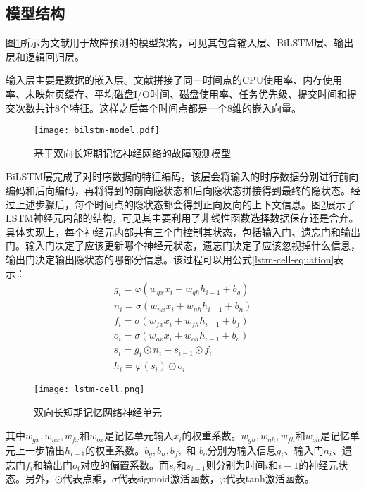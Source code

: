 \subsection{模型结构}
图\ref{bilstm-model}所示为文献\parencite{gao2020task}用于故障预测的模型架构，可见其包含输入层、BiLSTM层、输出层和逻辑回归层。

输入层主要是数据的嵌入层。文献\parencite{gao2020task}拼接了同一时间点的CPU使用率、内存使用率、未映射页缓存、平均磁盘I/O时间、磁盘使用率、任务优先级、提交时间和提交次数共计8个特征。这样之后每个时间点都是一个8维的嵌入向量。
\begin{figure}[htbp]
    \centering
    \texttt{[image: bilstm-model.pdf]}
    \caption{基于双向长短期记忆神经网络的故障预测模型\label{bilstm-model}}
\end{figure}

BiLSTM层完成了对时序数据的特征编码。该层会将输入的时序数据分别进行前向编码和后向编码，再将得到的前向隐状态和后向隐状态拼接得到最终的隐状态。经过上述步骤后，每个时间点的隐状态都会得到正向反向的上下文信息。图\ref{lstm-cell}展示了LSTM神经元内部的结构，可见其主要利用了非线性函数选择数据保存还是舍弃。具体实现上，每个神经元内部共有三个门控制其状态，包括输入门、遗忘门和输出门。输入门决定了应该更新哪个神经元状态，遗忘门决定了应该忽视掉什么信息，输出门决定输出隐状态的哪部分信息。该过程可以用公式\ref{lstm-cell-equation}表示：
\begin{equation}
    \begin{array}{l}
    g_{i}=\varphi\left(w_{g x} x_{i}+w_{g h} h_{i - 1}+b_{g}\right) \\
    n_{i}=\sigma\left(w_{n x} x_{i}+w_{n h} h_{i- 1}+b_{n}\right) \\
    f_{i}=\sigma\left(w_{f x} x_{i}+w_{f h} h_{i- 1}+b_{f}\right) \\
    o_{i}=\sigma\left(w_{o x} x_{i}+w_{o h} h_{i- 1}+b_{o}\right) \\
    s_{i}=g_{i} \odot n_{i}+s_{i -1} \odot f_{i} \\
    h_{i}=\varphi\left(s_{i}\right) \odot o_{i}
    \end{array}
    \label{lstm-cell-equation}
\end{equation}
\begin{figure}[htbp]
    \centering
    \texttt{[image: lstm-cell.png]}
    \caption{双向长短期记忆网络神经单元\cite{gao2020task}\label{lstm-cell}}
\end{figure}
其中$w_{gx}, w_{nx}, w_{fx} $和$w_{ox} $是记忆单元输入$x_{i}$的权重系数。$w_{gh}, w_{nh}, w_{fh} $和$w_{oh} $是记忆单元上一步输出$h_{i-1}$的权重系数。$b_{g}, b_{n}, b_{f},$ 和 $b_{o}$分别为输入信息$g_{i}$、输入门$n_{i}$、遗忘门$f_{i}$和输出门$o_{i}$对应的偏置系数。而$s_{i}$和$s_{i-1}$则分别为时间$i$和$i-1$的神经元状态。另外，$\odot$代表点乘，$\sigma$代表sigmoid激活函数，$\varphi$代表tanh激活函数。

